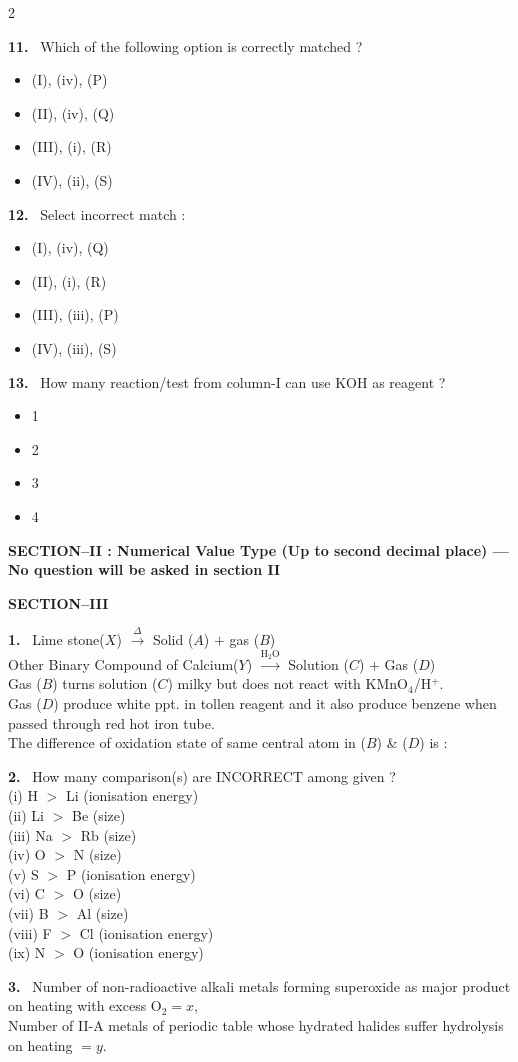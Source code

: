 \documentclass[10pt]{extarticle}
\newcommand{\sect}[1]{\par\smallskip\noindent\textbf{#1}\par}
\newcommand{\qn}[1]{\par\smallskip\noindent\textbf{#1.}~}
\newenvironment{qoptions}{\begin{itemize}[leftmargin=1.8em,itemsep=1pt,topsep=2pt,label={}]}{\end{itemize}}
\newcommand{\opt}[2]{\item[(#1)] #2}
\begin{document}
\begin{multicols}{2}
\qn{11} Which of the following option is correctly matched ?
\begin{qoptions}
\opt{A}{(I), (iv), (P)}
\opt{B}{(II), (iv), (Q)}
\opt{C}{(III), (i), (R)}
\opt{D}{(IV), (ii), (S)}
\end{qoptions}
\qn{12} Select incorrect match :
\begin{qoptions}
\opt{A}{(I), (iv), (Q)}
\opt{B}{(II), (i), (R)}
\opt{C}{(III), (iii), (P)}
\opt{D}{(IV), (iii), (S)}
\end{qoptions}
\qn{13} How many reaction/test from column-I can use KOH as reagent ?
\begin{qoptions}
\opt{A}{1}
\opt{B}{2}
\opt{C}{3}
\opt{D}{4}
\end{qoptions}
\par\smallskip\noindent\textbf{SECTION--II : Numerical Value Type (Up to second decimal place) --- No question will be asked in section II}\par
\sect{SECTION--III}
\qn{1} Lime stone($X$) $\xrightarrow{\Delta}$ Solid ($A$) $+$ gas ($B$)\\
Other Binary Compound of Calcium($Y$) $\xrightarrow{\mathrm{H_2O}}$ Solution ($C$) $+$ Gas ($D$)\\
Gas ($B$) turns solution ($C$) milky but does not react with KMnO$_4$/H$^+$.\\
Gas ($D$) produce white ppt. in tollen reagent and it also produce benzene when passed through red hot iron tube.\\
The difference of oxidation state of same central atom in ($B$) \& ($D$) is :
\qn{2} How many comparison(s) are INCORRECT among given ?\\
(i) H $>$ Li (ionisation energy)\\
(ii) Li $>$ Be (size)\\
(iii) Na $>$ Rb (size)\\
(iv) O $>$ N (size)\\
(v) S $>$ P (ionisation energy)\\
(vi) C $>$ O (size)\\
(vii) B $>$ Al (size)\\
(viii) F $>$ Cl (ionisation energy)\\
(ix) N $>$ O (ionisation energy)
\qn{3} Number of non-radioactive alkali metals forming superoxide as major product on heating with excess O$_2=x$,\\
Number of II-A metals of periodic table whose hydrated halides suffer hydrolysis on heating $=y$.\\

\end{multicols}
\end{document}
